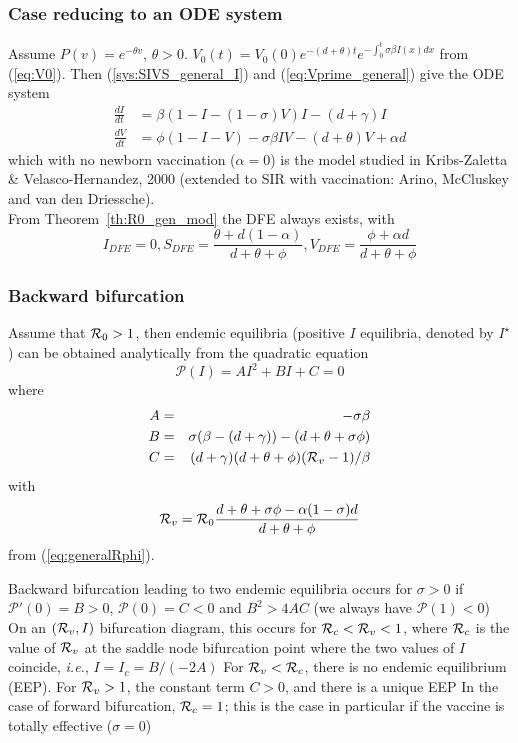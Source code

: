 \documentclass[aspectratio=169]{beamer}\usepackage[]{graphicx}\usepackage[]{xcolor}
\begin{document}
\begin{frame}\frametitle{Case reducing to an ODE system}
Assume $P(v)=e^{-\theta v}$, $\theta>0$.
$V_0(t)=V_0(0)e^{-(d+\theta)t}e^{-\int_0^t\sigma\beta I(x)dx}$ from
(\ref{eq:V0}). Then (\ref{sys:SIVS_general_I}) and
(\ref{eq:Vprime_general}) give the ODE system
\begin{subequations}\label{ODEmodel}
\begin{align}
\frac{dI}{dt}&= \beta(1-I-(1-\sigma)V)I-(d+\gamma)I
\label{ODEmodelI}\\
\frac{dV}{dt}&= \phi(1-I-V)-\sigma\beta IV -(d+\theta)V+\alpha d
\label{ODEmodelV}
\end{align}
\end{subequations}
which with no newborn vaccination ($\alpha=0$) is the model studied in
Kribs-Zaletta \& Velasco-Hernandez, 2000 (extended to SIR with
vaccination: Arino,
McCluskey and van den Driessche).\\[0.2cm]

From Theorem~\ref{th:R0_gen_mod} the DFE always exists, with
\[
I_{DFE}=0,
S_{DFE}=\frac{\theta+d(1-\alpha)}{d+\theta+\phi},
V_{DFE}=\frac{\phi+\alpha d}{d+\theta+\phi}
\]
\end{frame}



\begin{frame}\frametitle{Backward bifurcation}
Assume that $\mathcal{R}_0>1$, then endemic equilibria (positive $I$
equilibria, denoted
by $I^\star$) can be obtained analytically from the quadratic equation
\[
\mathcal{P} (I)=AI^2+BI+C=0
\]
where
\begin{eqnarray*}
A&=& -\sigma\beta \\
B&=& \sigma(\beta-(d+\gamma))-(d+\theta+\sigma\phi)\\
C&=& (d+\gamma)(d+\theta+\phi)(\mathcal{R}_v-1)/\beta
\end{eqnarray*}
with
\[
\mathcal{R}_v=\mathcal{R}_0\frac{d+\theta+\sigma\phi-\alpha(1-\sigma)d}{d+\theta+\phi}
\]
from  (\ref{eq:generalRphi}).
\end{frame}

\begin{frame}
Backward bifurcation leading to two endemic
equilibria occurs for $\sigma>0$ if $ \mathcal{P}'(0)=B>0$,
$\mathcal{P}(0)=C<0$ and $B^2>4AC$ (we always have
$\mathcal{P}(1)<0$)
\vfill
\bbullet
On an $(\mathcal{R}_v,I)$ bifurcation diagram, this occurs for
$\mathcal{R}_c<\mathcal{R}_v<1$, where $\mathcal{R}_c$ is the value of $\mathcal{R}_v$ at
the saddle node bifurcation point where the two values of $I$ coincide,
\emph{i.e.}, $I=I_c=B/(-2A)$
\vfill
\bbullet
For $\mathcal{R}_v<\mathcal{R}_c$, there is no endemic equilibrium (EEP).
For $\mathcal{R}_v>1$, the constant term $C>0$, and there is a unique EEP
\vfill
\bbullet
In the case of forward bifurcation, $\mathcal{R}_c=1$; this is the case in
particular if the vaccine is totally effective ($\sigma=0$)
\end{frame}
\end{document}
